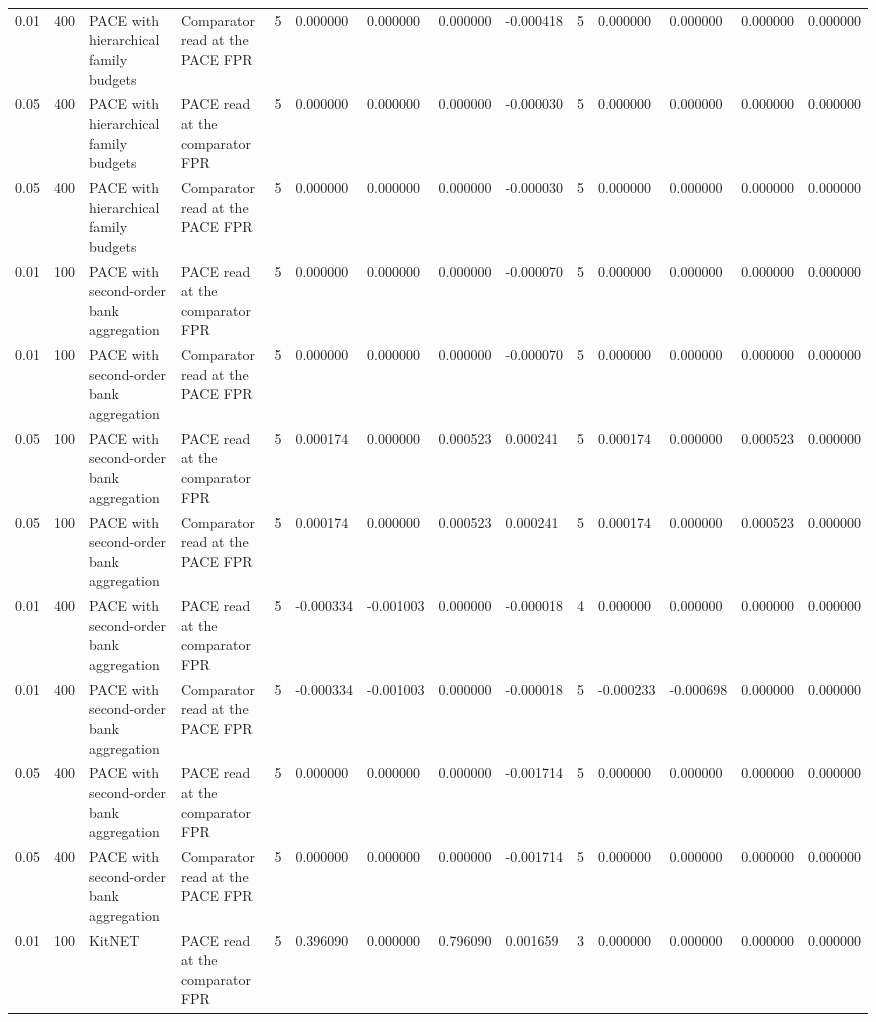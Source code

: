 \begin{tabular}{llllllllllllll}
0.01 & 400 & PACE with hierarchical family budgets & Comparator read at the PACE FPR & 5 & 0.000000 & 0.000000 & 0.000000 & -0.000418 & 5 & 0.000000 & 0.000000 & 0.000000 & 0.000000 \\
0.05 & 400 & PACE with hierarchical family budgets & PACE read at the comparator FPR & 5 & 0.000000 & 0.000000 & 0.000000 & -0.000030 & 5 & 0.000000 & 0.000000 & 0.000000 & 0.000000 \\
0.05 & 400 & PACE with hierarchical family budgets & Comparator read at the PACE FPR & 5 & 0.000000 & 0.000000 & 0.000000 & -0.000030 & 5 & 0.000000 & 0.000000 & 0.000000 & 0.000000 \\
0.01 & 100 & PACE with second-order bank aggregation & PACE read at the comparator FPR & 5 & 0.000000 & 0.000000 & 0.000000 & -0.000070 & 5 & 0.000000 & 0.000000 & 0.000000 & 0.000000 \\
0.01 & 100 & PACE with second-order bank aggregation & Comparator read at the PACE FPR & 5 & 0.000000 & 0.000000 & 0.000000 & -0.000070 & 5 & 0.000000 & 0.000000 & 0.000000 & 0.000000 \\
0.05 & 100 & PACE with second-order bank aggregation & PACE read at the comparator FPR & 5 & 0.000174 & 0.000000 & 0.000523 & 0.000241 & 5 & 0.000174 & 0.000000 & 0.000523 & 0.000000 \\
0.05 & 100 & PACE with second-order bank aggregation & Comparator read at the PACE FPR & 5 & 0.000174 & 0.000000 & 0.000523 & 0.000241 & 5 & 0.000174 & 0.000000 & 0.000523 & 0.000000 \\
0.01 & 400 & PACE with second-order bank aggregation & PACE read at the comparator FPR & 5 & -0.000334 & -0.001003 & 0.000000 & -0.000018 & 4 & 0.000000 & 0.000000 & 0.000000 & 0.000000 \\
0.01 & 400 & PACE with second-order bank aggregation & Comparator read at the PACE FPR & 5 & -0.000334 & -0.001003 & 0.000000 & -0.000018 & 5 & -0.000233 & -0.000698 & 0.000000 & 0.000000 \\
0.05 & 400 & PACE with second-order bank aggregation & PACE read at the comparator FPR & 5 & 0.000000 & 0.000000 & 0.000000 & -0.001714 & 5 & 0.000000 & 0.000000 & 0.000000 & 0.000000 \\
0.05 & 400 & PACE with second-order bank aggregation & Comparator read at the PACE FPR & 5 & 0.000000 & 0.000000 & 0.000000 & -0.001714 & 5 & 0.000000 & 0.000000 & 0.000000 & 0.000000 \\
0.01 & 100 & KitNET & PACE read at the comparator FPR & 5 & 0.396090 & 0.000000 & 0.796090 & 0.001659 & 3 & 0.000000 & 0.000000 & 0.000000 & 0.000000 \\

\end{tabular}
